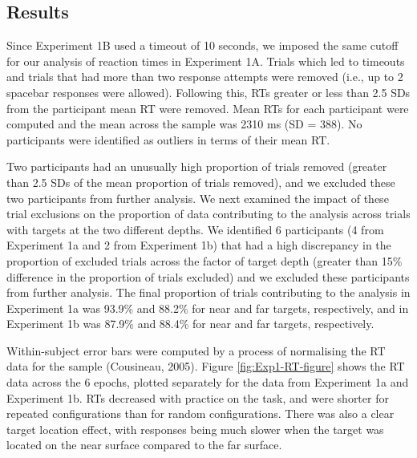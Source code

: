 \documentclass[
  english,
  man,floatsintext]{apa7}
\begin{document}
\hypertarget{results}{%
\subsection{Results}\label{results}}

Since Experiment 1B used a timeout of 10 seconds, we imposed the same cutoff for our analysis of reaction times in Experiment 1A. Trials which led to timeouts and trials that had more than two response attempts were removed (i.e., up to 2 spacebar responses were allowed). Following this, RTs greater or less than 2.5 SDs from the participant mean RT were removed. Mean RTs for each participant were computed and the mean across the sample was 2310 ms (SD = 388). No participants were identified as outliers in terms of their mean RT.

Two participants had an unusually high proportion of trials removed (greater than 2.5 SDs of the mean proportion of trials removed), and we excluded these two participants from further analysis. We next examined the impact of these trial exclusions on the proportion of data contributing to the analysis across trials with targets at the two different depths. We identified 6 participants (4 from Experiment 1a and 2 from Experiment 1b) that had a high discrepancy in the proportion of excluded trials across the factor of target depth (greater than 15\% difference in the proportion of trials excluded) and we excluded these participants from further analysis. The final proportion of trials contributing to the analysis in Experiment 1a was 93.9\% and 88.2\% for near and far targets, respectively, and in Experiment 1b was 87.9\% and 88.4\% for near and far targets, respectively.

Within-subject error bars were computed by a process of normalising the RT data for the sample (Cousineau, 2005). Figure \ref{fig:Exp1-RT-figure} shows the RT data across the 6 epochs, plotted separately for the data from Experiment 1a and Experiment 1b. RTs decreased with practice on the task, and were shorter for repeated configurations than for random configurations. There was also a clear target location effect, with responses being much slower when the target was located on the near surface compared to the far surface.
\end{document}
